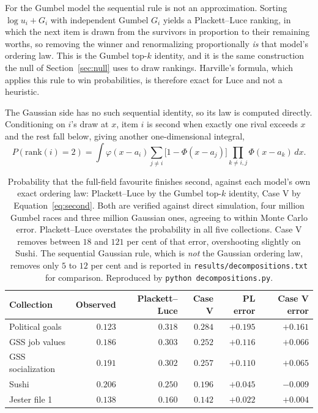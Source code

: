 \documentclass[11pt]{article}
\theoremstyle{italichead}
\begin{document}
For the Gumbel model the sequential rule is not an approximation. Sorting
$\log u_i + G_i$ with independent Gumbel $G_i$ yields a Plackett--Luce ranking, in which the next
item is drawn from the survivors in proportion to their remaining worths, so removing the winner
and renormalizing proportionally \emph{is} that model's ordering law. This is the Gumbel top-$k$
identity, and it is the same construction the null of Section~\ref{sec:null} uses to draw
rankings. Harville's formula, which applies this rule to win probabilities, is therefore
exact for Luce and not a heuristic.

The Gaussian side has no such sequential identity, so its law is computed directly. Conditioning
on $i$'s draw at $x$, item $i$ is second when exactly one rival exceeds $x$ and the rest fall
below, giving another one-dimensional integral,
\begin{equation}
P(\mathrm{rank}(i) = 2) = \int \varphi(x - a_i)
  \sum_{j \neq i} \bigl[1 - \Phi(x - a_j)\bigr]
  \prod_{k \neq i,j} \Phi(x - a_k)\, dx .
\label{eq:second}
\end{equation}

\begin{table}[htbp]
\centering
\small
\begin{tabular}{lrrrrr}
\toprule
Collection & Observed & Plackett--Luce & Case V & PL error & Case V error \\
\midrule
Political goals & $0.123$ & $0.318$ & $0.284$ & $+0.195$ & $+0.161$ \\
GSS job values & $0.186$ & $0.303$ & $0.252$ & $+0.116$ & $+0.066$ \\
GSS socialization & $0.191$ & $0.302$ & $0.257$ & $+0.110$ & $+0.065$ \\
Sushi & $0.206$ & $0.250$ & $0.196$ & $+0.045$ & $-0.009$ \\
Jester file 1 & $0.138$ & $0.160$ & $0.142$ & $+0.022$ & $+0.004$ \\
\bottomrule
\end{tabular}
\caption{Probability that the full-field favourite finishes second, against each model's own
exact ordering law: Plackett--Luce by the Gumbel top-$k$ identity, Case V by
Equation~\eqref{eq:second}. Both are verified against direct simulation, four million Gumbel
races and three million Gaussian ones, agreeing to within Monte Carlo error. Plackett--Luce
overstates the probability in all five collections. Case V removes between $18$ and $121$ per
cent of that error, overshooting slightly on Sushi. The sequential Gaussian rule, which is
\emph{not} the Gaussian ordering law, removes only $5$ to $12$ per cent and is reported in
\texttt{results/decompositions.txt} for comparison. Reproduced by
\texttt{python decompositions.py}.}
\label{tab:favsecond}
\end{table}
\end{document}
